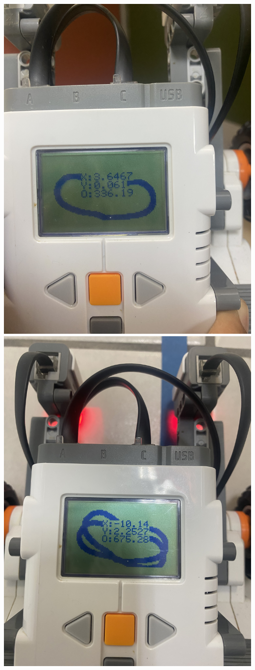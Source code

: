 \documentclass[oneside,twocolumn]{article}
\begin{document}
\includegraphics[scale=0.09]{graficos/corrida1.png}
\includegraphics[scale=0.09]{graficos/corrida2.png}
\end{document}
